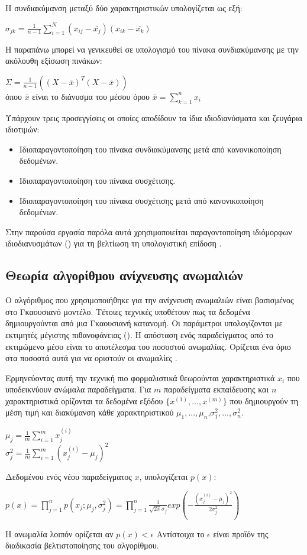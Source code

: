 Η συνδιακύμανση μεταξύ δύο χαρακτηριστικών υπολογίζεται ως εξή:
\begin{center}
$\sigma_{jk}=\frac{1}{n-1}\sum_{i=1}^N(x_{ij}-\bar{x_j})(x_{ik}-\bar{x_k})$
\end{center}
Η παραπάνω μπορεί να γενικευθεί σε υπολογισμό του πίνακα συνδιακύμανσης με την ακόλουθη εξίσωση πινάκων:
\begin{center}
$\Sigma=\frac{1}{n-1}((X-\bar{x})^T(X-\bar{x}))$\\
όπου $\bar{x}$ είναι το διάνυσμα του μέσου όρου $\bar{x}=\sum_{k=1}^nx_i$
\end{center}
Υπάρχουν τρεις προσεγγίσεις οι οποίες αποδίδουν τα ίδια ιδιοδιανύσματα και ζευγάρια ιδιοτιμών:
\begin{itemize}
\item Ιδιοπαραγοντοποίηση του πίνακα συνδιακύμανσης μετά από κανονικοποίηση δεδομένων.
\item Ιδιοπαραγοντοποίηση του πίνακα συσχέτισης.
\item Ιδιοπαραγοντοποίηση του πίνακα συσχέτισης μετά από κανονικοποίηση δεδομένων.
\end{itemize}
Στην παρούσα εργασία παρόλα αυτά χρησιμοποιείται παραγοντοποίηση ιδιόμορφων ιδιοδιανυσμάτων () για τη βελτίωση τη υπολογιστική επίδοση \cite{Plotly}.
\subsection{Θεωρία αλγορίθμου ανίχνευσης ανωμαλιών}
Ο αλγόριθμος που χρησιμοποιήθηκε για την ανίχνευση ανωμαλιών είναι βασισμένος στο Γκαουσιανό μοντέλο. Τέτοιες τεχνικές υποθέτουν πως τα δεδομένα δημιουργούνται από μια Γκαουσιανή κατανομή. Οι παράμετροι υπολογίζονται με εκτιμητές μέγιστης πιθανοφάνειας (). Η απόσταση ενός παραδείγματος από το εκτιμώμενο μέσο είναι το αποτέλεσμα του ποσοστού ανωμαλίας. Ορίζεται ένα όριο στα ποσοστά αυτά για να οριστούν οι ανωμαλίες \cite{Anomaly}.\par
Ερμηνεύοντας αυτή την τεχνική πιο φορμαλιστικά θεωρούνται χαρακτηριστικά $x_i$ που υποδεικνύουν ανώμαλα παραδείγματα. Για $m$ παραδείγματα εκπαίδευσης και $n$ χαρακτηριστικά ορίζονται τα δεδομένα εξόδου $\{x^{(1)}, ...,x^{(m)}\}$ που δημιουργούν τη μέση τιμή και διακύμανση κάθε χαρακτηριστικού $\mu_1, ...,\mu_n$,$\sigma_1^2, ..., \sigma_n^2 $.
\begin{center}
$\mu_j=\frac{1}{m}\sum_{i=1}^m x_j^{(i)}$\\ $\sigma_j^2=\frac{1}{m}\sum_{i=1}^m (x_j^{(i)} -\mu_j)^2$\\
\end{center}
Δεδομένου ενός νέου παραδείγματος $x$, υπολογίζεται $p(x)$:\\
\begin{center}
$p(x)=\prod_{j=1}^n p(x_j;\mu_j, \sigma_j^2)=\prod_{j=1}^n \frac{1}{\sqrt{2\pi}\sigma_j}exp(-\frac{(x_j^{(i)} -\mu_j)^2}{2\sigma_j^2})$
\end{center}
Η ανωμαλία λοιπόν ορίζεται αν $p(x)<\epsilon$
Αντίστοιχα το $\epsilon$ είναι προϊόν της διαδικασία βελτιστοποίησης του αλγορίθμου.

